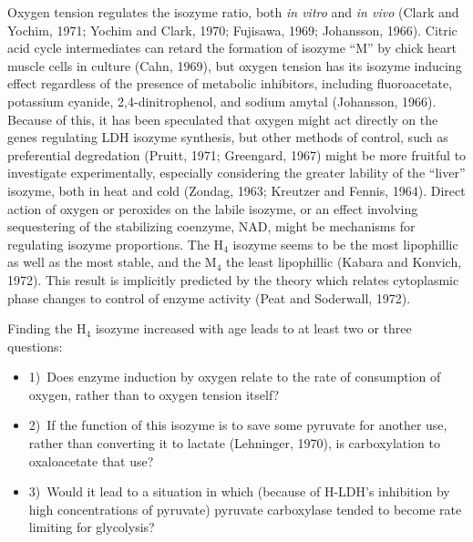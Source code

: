 Oxygen tension regulates the isozyme ratio, both \textit{in vitro} and \textit{in vivo} (Clark and Yochim, 1971; Yochim and Clark, 1970; Fujisawa, 1969; Johansson, 1966). Citric acid cycle intermediates can retard the formation of isozyme ``M'' by chick heart muscle cells in culture (Cahn, 1969), but oxygen tension has its isozyme inducing effect regardless of the presence of metabolic inhibitors, including fluoroacetate, potassium cyanide, 2,4-dinitrophenol, and sodium amytal (Johansson, 1966). Because of this, it has been speculated that oxygen might act directly on the genes regulating LDH isozyme synthesis, but other methods of control, such as preferential degredation (Pruitt, 1971; Greengard, 1967) might be more fruitful to investigate experimentally, especially considering the greater lability of the ``liver'' isozyme, both in heat and cold (Zondag, 1963; Kreutzer and Fennis, 1964). Direct action of oxygen or peroxides on the labile isozyme, or an effect involving sequestering of the stabilizing coenzyme, NAD, might be mechanisms for regulating isozyme proportions. The H$_{4}$ isozyme seems to be the most lipophillic as well as the most stable, and the M$_{4}$ the least lipophillic (Kabara and Konvich, 1972). This result is implicitly predicted by the theory which relates cytoplasmic phase changes to control of enzyme activity (Peat and Soderwall, 1972).

Finding the H$_{4}$ isozyme increased with age leads to at least two or three questions:

\begin{center}
\begin{adjustwidth}{0.1\linewidth}{0.1\linewidth}
\begin{itemize}[label={}, leftmargin=*, rightmargin=0pt]
    \item 1)~Does enzyme induction by oxygen relate to the rate of consumption of oxygen, rather than to oxygen tension itself?
    \item 2)~If the function of this isozyme is to save some pyruvate for another use, rather than converting it to lactate (Lehninger, 1970), is carboxylation to oxaloacetate that use?
    \item 3)~Would it lead to a situation in which (because of H-LDH's inhibition by high concentrations of pyruvate) pyruvate carboxylase tended to become rate limiting for glycolysis?
\end{itemize}
\end{adjustwidth}
\end{center}

